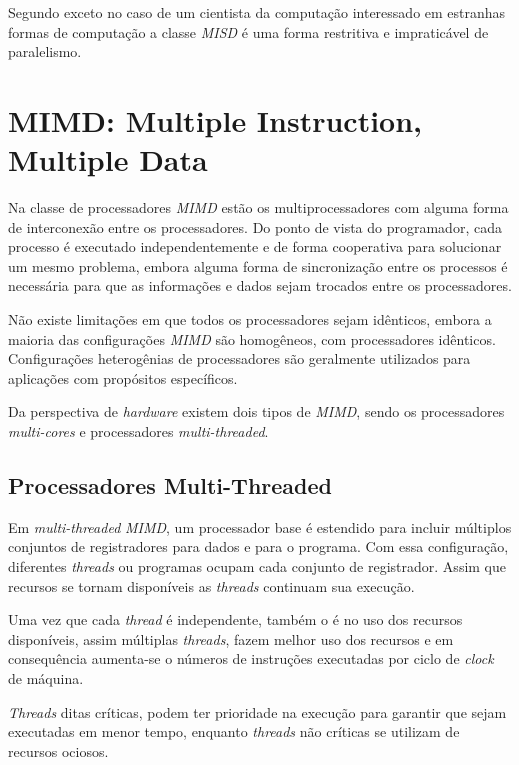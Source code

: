 Segundo \cite{Openshaw:1999} exceto no caso de um cientista da computação
interessado em estranhas formas de computação a classe \textit{MISD} é uma forma
restritiva e impraticável de paralelismo.

\section{MIMD: Multiple Instruction, Multiple Data}

Na classe de processadores \textit{MIMD} estão os multiprocessadores
com alguma forma de interconexão entre os processadores. Do ponto de vista do
programador, cada processo é executado independentemente e de forma cooperativa
para solucionar um mesmo problema, embora alguma forma de sincronização entre os
processos é necessária para que as informações e dados sejam trocados entre os
processadores.

Não existe limitações em que todos os processadores sejam idênticos, embora a
maioria das configurações \textit{MIMD} são homogêneos, com processadores
idênticos. Configurações heterogênias de processadores são geralmente utilizados
para aplicações com propósitos específicos.

Da perspectiva de \textit{hardware} existem dois tipos de \textit{MIMD}, sendo os
processadores \textit{multi-cores} e processadores \textit{multi-threaded}.


\subsection{Processadores Multi-Threaded}

Em \textit{multi-threaded} \textit{MIMD}, um processador base é
estendido para incluir múltiplos conjuntos de registradores para dados e para o
programa.
Com essa configuração, diferentes \textit{threads} ou programas ocupam cada
conjunto de registrador. Assim que recursos se tornam disponíveis as
\textit{threads} continuam sua execução.

Uma vez que cada \textit{thread} é independente, também o é no uso dos recursos
disponíveis, assim múltiplas \textit{threads}, fazem melhor uso dos recursos e
em consequência aumenta-se o números de instruções executadas por ciclo de
\textit{clock} de máquina.

\textit{Threads} ditas críticas, podem ter prioridade na execução para garantir
que sejam executadas em menor tempo, enquanto \textit{threads} não críticas se
utilizam de recursos ociosos.


